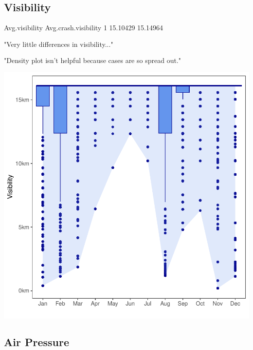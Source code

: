 \documentclass[11pt, a4paper]{article}
\begin{document}
\pagebreak
\subsection{Visibility}

\begin{Schunk}
\begin{Soutput}
  Avg.visibility Avg.crash.visibility
1       15.10429             15.14964
\end{Soutput}
\begin{Soutput}
[1] "Very little differences in visibility..."
\end{Soutput}
\begin{Soutput}
[1] "Density plot isn't helpful because cases are so spread out."
\end{Soutput}
\end{Schunk}

\includegraphics{variableinvestigation-018}



\pagebreak
\subsection{Air Pressure}
\end{document}
